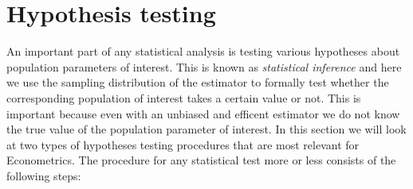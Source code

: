 \documentclass[
]{book}
\theoremstyle{definition}
\theoremstyle{definition}
\theoremstyle{definition}
\theoremstyle{definition}
\theoremstyle{remark}
\begin{document}
\hypertarget{hypothesis-testing}{%
\section{Hypothesis testing}\label{hypothesis-testing}}

An important part of any statistical analysis is testing various hypotheses about population parameters of interest. This is known as \emph{statistical inference} and here we use the sampling distribution of the estimator to formally test whether the corresponding population of interest takes a certain value or not. This is important because even with an unbiased and efficent estimator we do not know the true value of the population parameter of interest. In this section we will look at two types of hypotheses testing procedures that are most relevant for Econometrics. The procedure for any statistical test more or less consists of the following steps:
\end{document}
